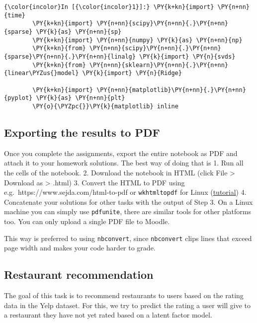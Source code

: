 
    \begin{Verbatim}[commandchars=\\\{\}]
{\color{incolor}In [{\color{incolor}1}]:} \PY{k+kn}{import} \PY{n+nn}{time}
        \PY{k+kn}{import} \PY{n+nn}{scipy}\PY{n+nn}{.}\PY{n+nn}{sparse} \PY{k}{as} \PY{n+nn}{sp}
        \PY{k+kn}{import} \PY{n+nn}{numpy} \PY{k}{as} \PY{n+nn}{np}
        \PY{k+kn}{from} \PY{n+nn}{scipy}\PY{n+nn}{.}\PY{n+nn}{sparse}\PY{n+nn}{.}\PY{n+nn}{linalg} \PY{k}{import} \PY{n}{svds}
        \PY{k+kn}{from} \PY{n+nn}{sklearn}\PY{n+nn}{.}\PY{n+nn}{linear\PYZus{}model} \PY{k}{import} \PY{n}{Ridge}
        
        \PY{k+kn}{import} \PY{n+nn}{matplotlib}\PY{n+nn}{.}\PY{n+nn}{pyplot} \PY{k}{as} \PY{n+nn}{plt}
        \PY{o}{\PYZpc{}}\PY{k}{matplotlib} inline
\end{Verbatim}

    \hypertarget{exporting-the-results-to-pdf}{%
\subsection{Exporting the results to
PDF}\label{exporting-the-results-to-pdf}}

Once you complete the assignments, export the entire notebook as PDF and
attach it to your homework solutions. The best way of doing that is 1.
Run all the cells of the notebook. 2. Download the notebook in HTML
(click File \textgreater{} Download as \textgreater{} .html) 3. Convert
the HTML to PDF using e.g.~https://www.sejda.com/html-to-pdf or
\texttt{wkhtmltopdf} for Linux
(\href{https://www.cyberciti.biz/open-source/html-to-pdf-freeware-linux-osx-windows-software/}{tutorial})
4. Concatenate your solutions for other tasks with the output of Step 3.
On a Linux machine you can simply use \texttt{pdfunite}, there are
similar tools for other platforms too. You can only upload a single PDF
file to Moodle.

This way is preferred to using \texttt{nbconvert}, since
\texttt{nbconvert} clips lines that exceed page width and makes your
code harder to grade.

    \hypertarget{restaurant-recommendation}{%
\subsection{Restaurant recommendation}\label{restaurant-recommendation}}

The goal of this task is to recommend restaurants to users based on the
rating data in the Yelp dataset. For this, we try to predict the rating
a user will give to a restaurant they have not yet rated based on a
latent factor model.


